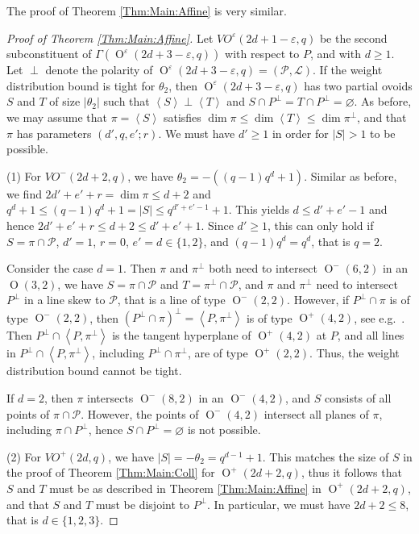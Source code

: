 \documentclass[a4paper]{article}
\theoremstyle{definition}
\newcommand{\eps}{\varepsilon}
\renewcommand{\leq}{\leqslant}
\renewcommand{\geq}{\geqslant}
\newcommand{\vspan}[1]{\left\langle #1 \right\rangle}
\newcommand{\ml}{\mathcal L}
\renewcommand{\mp}{\mathcal P}
\DeclareMathOperator{\OO}{O}
\begin{document}
The proof of Theorem \ref{Thm:Main:Affine} is very similar.

\begin{proof}[Proof of Theorem \ref{Thm:Main:Affine}]
Let $VO^\eps(2d+1-\eps,q)$ be the second subconstituent of $\Gamma(\OO^\eps(2d+3-\eps,q))$ with respect to $P$, and with $d\geq 1$.
Let $\perp$ denote the polarity of $\OO^\eps(2d+3-\eps,q) = (\mp,\ml)$.
If the weight distribution bound is tight for $\theta_2$, then $\OO^\eps(2d+3-\eps,q)$ has two partial ovoids $S$ and $T$ of size $|\theta_2|$ such that $\vspan S \perp \vspan T$ and $S \cap P^\perp = T \cap P^\perp = \varnothing$.
As before, we may assume that $\pi = \vspan S$ satisfies $\dim \pi \leq \dim \vspan T \leq \dim \pi^\perp$, and that $\pi$ has parameters $(d',q,e';r)$.
We must have $d' \geq 1$ in order for $|S| > 1$ to be possible.

\bigskip 

(1) For $VO^-(2d+2,q)$, we have $\theta_2 = -((q-1)q^d + 1)$.
Similar as before, we find $2d'+e'+r = \dim \pi \leq d+2$ and $q^d + 1 \leq (q-1)q^d+1 = |S| \leq q^{d'+e'-1}+1$.
This yields $d \leq d'+e'-1$ and hence $2d'+e'+r \leq d+2 \leq d'+e'+1$.
Since $d' \geq 1$, this can only hold if $S = \pi \cap \mp$, $d'=1$, $r=0$, $e' = d \in \{1,2\}$, and $(q-1)q^d = q^d$, that is $q=2$.

Consider the case $d=1$.
Then $\pi$ and $\pi^\perp$ both need to intersect $\OO^-(6,2)$ in an $\OO(3,2)$, we have $S = \pi \cap \mp$ and $T = \pi^\perp \cap \mp$, and $\pi$ and $\pi^\perp$ need to intersect $P^\perp$ in a line skew to $\mp$, that is a line of type $\OO^-(2,2)$.
However, if $P^\perp \cap \pi$ is of type $\OO^-(2,2)$, then $(P^\perp \cap \pi)^\perp = \vspan{P,\pi^\perp}$ is of type $\OO^+(4,2)$, see e.g.\ \cite[Table 1.4]{Hirschfeld:Thas}.
Then $P^\perp \cap \vspan{P,\pi^\perp}$ is the tangent hyperplane of $\OO^+(4,2)$ at $P$, and all lines in $P^\perp \cap \vspan{P,\pi^\perp}$, including $P^\perp \cap \pi^\perp$, are of type $\OO^+(2,2)$.
Thus, the weight distribution bound cannot be tight.

If $d=2$, then $\pi$ intersects $\OO^-(8,2)$ in an $\OO^-(4,2)$, and $S$ consists of all points of $\pi \cap \mp$.
However, the points of $\OO^-(4,2)$ intersect all planes of $\pi$, including $\pi \cap P^\perp$, hence $S \cap P^\perp = \varnothing$ is not possible.

\bigskip 

(2) For $VO^+(2d,q)$, we have $|S| = -\theta_2 = q^{d-1}+1$.
This matches the size of $S$ in the proof of Theorem \ref{Thm:Main:Coll} for $\OO^+(2d+2,q)$, thus it follows that $S$ and $T$ must be as described in Theorem \ref{Thm:Main:Affine} in $\OO^+(2d+2,q)$, and that $S$ and $T$ must be disjoint to $P^\perp$.
In particular, we must have $2d+2 \leq 8$, that is $d \in \{1,2,3\}$.


\end{proof}
\end{document}
